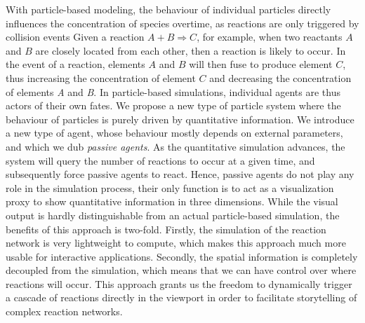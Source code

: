 With particle-based modeling, the behaviour of individual particles directly influences the concentration of species overtime, as reactions are only triggered by collision events
Given a reaction $A + B \Rightarrow C$, for example, when two reactants $A$ and $B$ are closely located from each other, then a reaction is likely to occur.
In the event of a reaction, elements $A$ and $B$ will then fuse to produce element $C$, thus increasing the concentration of element $C$ and decreasing the concentration of elements \textit{A} and \textit{B}.
In particle-based simulations, individual agents are thus actors of their own fates.
We propose a new type of particle system where the behaviour of particles is purely driven by quantitative information.
We introduce a new type of agent, whose behaviour mostly depends on external parameters, and which we dub \emph{passive agents}.
As the quantitative simulation advances, the system will query the number of reactions to occur at a given time, and subsequently force passive agents to react.
Hence, passive agents do not play any role in the simulation process, their only function is to act as a visualization proxy to show quantitative information in three dimensions.
While the visual output is hardly distinguishable from an actual particle-based simulation, the benefits of this approach is two-fold.
Firstly, the simulation of the reaction network is very lightweight to compute, which makes this approach much more usable for interactive applications.
Secondly, the spatial information is completely decoupled from the simulation, which means that we can have control over where reactions will occur.
This approach grants us the freedom to dynamically trigger a cascade of reactions directly in the viewport in order to facilitate storytelling of complex reaction networks.


